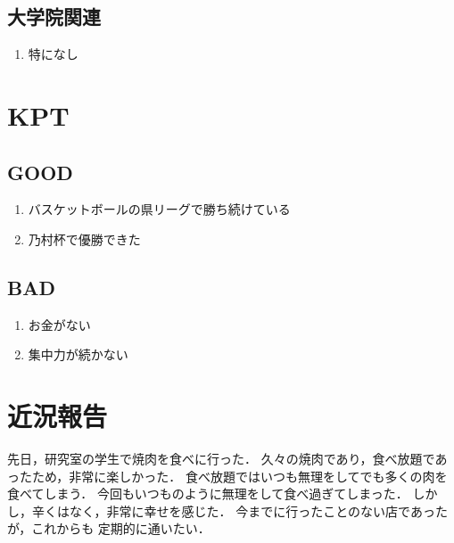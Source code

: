 \documentclass[fleqn, 14pt]{extarticlej}
\begin{document}
  \subsection{大学院関連}
  \begin{enumerate}
      \item 特になし
  \end{enumerate}

\section{KPT}
  \subsection{GOOD}
  \begin{enumerate}
   \item バスケットボールの県リーグで勝ち続けている
   \item 乃村杯で優勝できた
  \end{enumerate}

  \subsection{BAD}
  \begin{enumerate}
   \item お金がない
   \item 集中力が続かない
  \end{enumerate}

\section{近況報告}
先日，研究室の学生で焼肉を食べに行った．
久々の焼肉であり，食べ放題であったため，非常に楽しかった．
食べ放題ではいつも無理をしてでも多くの肉を食べてしまう．
今回もいつものように無理をして食べ過ぎてしまった．
しかし，辛くはなく，非常に幸せを感じた．
今までに行ったことのない店であったが，これからも
定期的に通いたい．
\end{document}
